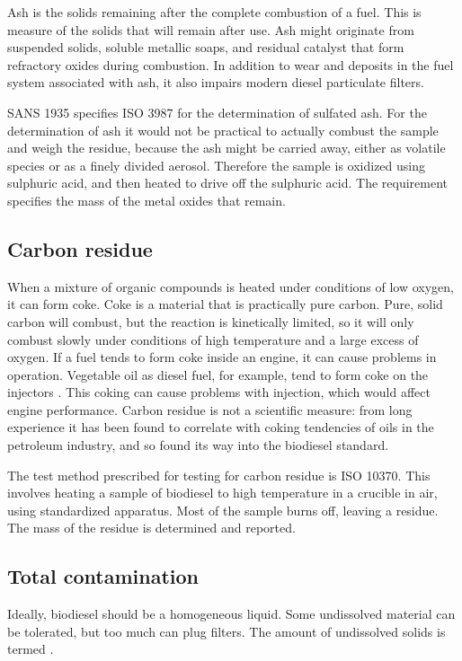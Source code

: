 Ash is the solids remaining after the complete combustion of a fuel. This is
measure of the solids that will remain after use. Ash might originate from
suspended solids, soluble metallic soaps, and residual catalyst that form
refractory oxides during combustion. In addition to wear and deposits in the
fuel system associated with ash, it also impairs modern diesel particulate
filters.

SANS 1935 specifies ISO 3987 for the determination of sulfated ash. For the
determination of ash it would not be practical to actually combust the sample
and weigh the residue, because the ash might be carried away, either as volatile
species or as a finely divided aerosol. Therefore the sample is oxidized using
sulphuric acid, and then heated to drive off the sulphuric acid. The requirement
specifies the mass of the metal oxides that remain.

\subsection{Carbon residue}

When a mixture of organic compounds is heated under conditions of low oxygen, it
can form coke. Coke is a material that is practically pure carbon. Pure, solid
carbon will combust, but the reaction is kinetically limited, so it will only
combust slowly under conditions of high temperature and a large excess of
oxygen. If a fuel tends to form coke inside an engine, it can cause problems in
operation. Vegetable oil as diesel fuel, for example, tend to form coke on the
injectors \autocite{vanderWalt1982}. This coking can cause problems with injection,
which would affect engine performance. Carbon residue is not a scientific
measure: from long experience it has been found to correlate with coking
tendencies of oils in the petroleum industry, and so found its way into the
biodiesel standard.

The test method prescribed for testing for carbon residue is ISO 10370. This
involves heating a sample of biodiesel to high temperature in a crucible in air,
using standardized apparatus. Most of the sample burns off, leaving a residue.
The mass of the residue is determined and reported.

\subsection{Total contamination}

Ideally, biodiesel should be a homogeneous liquid. Some undissolved material can
be tolerated, but too much can plug filters. The amount of undissolved solids is
termed .

